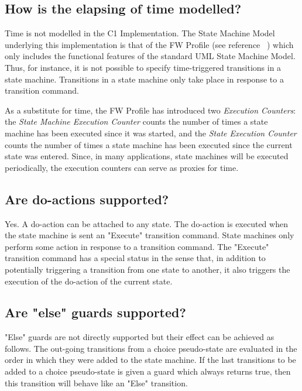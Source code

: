 \documentclass[a4paper,10pt]{article}
\begin{document}
\subsection{How is the elapsing of time modelled?}
Time is not modelled in the C1 Implementation. The State Machine Model underlying this implementation is that of the FW Profile 
(see reference ~\cite{ref:fwprofile}) which only 
includes the functional features of the standard UML State Machine Model. Thus, for instance, it is not possible to specify time-triggered transitions 
in a state machine. Transitions in a state machine only take place in response to a transition command. 

As a substitute for time, the FW Profile has introduced two \emph{Execution Counters}: the \emph{State Machine Execution Counter} counts the number 
of times a state machine has been executed since it was started, and the \emph{State Execution Counter} counts the number of times a state machine 
has been executed since the current state was entered. Since, in many applications, state machines will be executed periodically, the execution counters 
can serve as proxies for time.  

\subsection{Are do-actions supported?}
Yes. A do-action can be attached to any state. The do-action is executed when the state machine is sent an "Execute" transition command. State machines 
only perform some action in response to a transition command. The "Execute" transition command has a special status in the sense that, in addition 
to potentially triggering a transition from one state to another, it also triggers the execution of the do-action of the current state.  

\subsection{Are "else" guards supported?}
"Else" guards are not directly supported but their effect can be achieved as follows. The out-going transitions from a choice pseudo-state are evaluated 
in the order in which they were added to the state machine. If the last transitions to be added to a choice pseudo-state is given a guard which always 
returns true, then this transition will behave like an "Else" transition.
\end{document}
